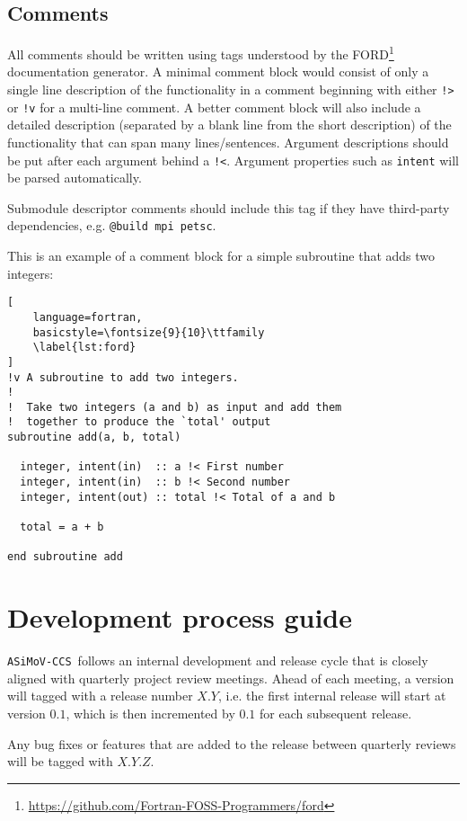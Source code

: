 \documentclass[11pt]{report}
\newcommand{\accs}{\texttt{ASiMoV-CCS}}
\begin{document}
\section{Comments}
All comments should be written using tags understood by the FORD\footnote{\url{https://github.com/Fortran-FOSS-Programmers/ford}} documentation generator. A minimal comment
block would consist of only a single line description of the functionality in a comment beginning with either \texttt{!>} or \texttt{!v} for a multi-line comment. A better comment
block will also include a detailed description (separated by a blank line from the short description) of the functionality that can span many 
lines/sentences. 
Argument descriptions should be put after each argument behind a \texttt{!<}. Argument properties such as \texttt{intent} will be parsed automatically.

Submodule descriptor comments should include this tag if they have third-party dependencies, e.g. \texttt{@build mpi petsc}.


This is an example of a comment block for a simple subroutine that adds two integers:

\begin{lstlisting}[
	language=fortran,
    basicstyle=\fontsize{9}{10}\ttfamily
    \label{lst:ford}
]
!v A subroutine to add two integers.
!
!  Take two integers (a and b) as input and add them
!  together to produce the `total' output
subroutine add(a, b, total)

  integer, intent(in)  :: a !< First number
  integer, intent(in)  :: b !< Second number
  integer, intent(out) :: total !< Total of a and b

  total = a + b

end subroutine add
\end{lstlisting}


\chapter{Development process guide}
\accs\ follows an internal development and release cycle that is closely aligned with quarterly project review meetings. Ahead of 
each meeting, a version will tagged with a release number $X.Y$, i.e. the first internal release will start at version $0.1$, which 
is then incremented by $0.1$ for each subsequent release. 

Any bug fixes or features that are added to the release between quarterly reviews will be tagged with $X.Y.Z$.
\end{document}
